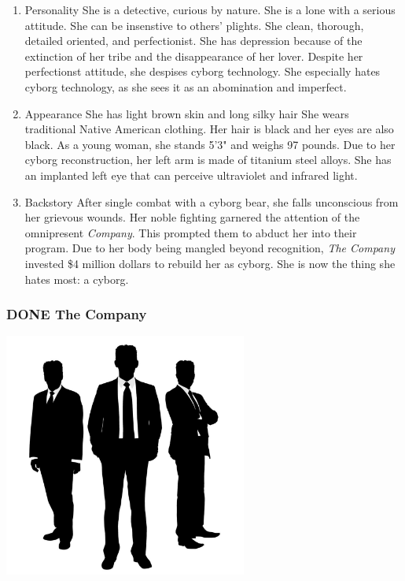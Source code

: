 \documentclass[11pt]{article}
\begin{document}
\begin{enumerate}
\item Personality
\label{sec:orgb640171}
She is a detective, curious by nature. She is a lone with a serious attitude. She can be insenstive to others' plights. She clean, thorough, detailed oriented, and perfectionist. She has depression because of the extinction of her tribe and the disappearance of her lover. Despite her perfectionst attitude, she despises cyborg technology. She especially hates cyborg technology, as she sees it as an abomination and imperfect.

\item Appearance
\label{sec:org5dc89f8}
She has light brown skin and long silky hair She wears traditional Native American clothing. Her hair is black and her eyes are also black. As a young woman, she stands 5'3" and weighs 97 pounds. Due to her cyborg reconstruction, her left arm is made of titanium steel alloys. She has an implanted left eye that can perceive ultraviolet and infrared light.

\item Backstory
\label{sec:org02136fe}
After single combat with a cyborg bear, she falls unconscious from her grievous wounds. Her noble fighting garnered the attention of the omnipresent \emph{Company}. This prompted them to abduct her into their program. Due to her body being mangled beyond recognition, \emph{The Company} invested \$4 million dollars to rebuild her as cyborg. She is now the thing she hates most: a cyborg.
\end{enumerate}

\subsubsection{{\bfseries\sffamily DONE} The Company}
\label{sec:orge040dba}
\begin{center}
\includegraphics[width=8cm]{./img/the-company.png}
\end{center}
\end{document}
